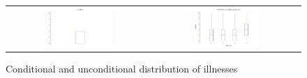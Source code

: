 \begin{figure}[htbp]
  \centering
  \begin{tabular}{cc}
    \includegraphics[width=0.475\textwidth]{figures/uboxplot} & 
    \includegraphics[width=0.475\textwidth]{figures/fboxplot}
  \end{tabular}
  \caption{Conditional and unconditional distribution of illnesses}
  \label{fig:fact-boxplots}
\end{figure}


